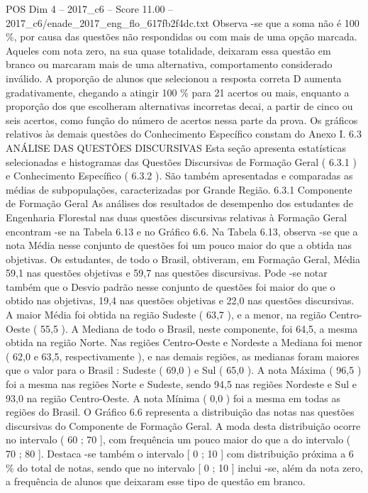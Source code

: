 \begin{textsample}{POS Dim 4 – 2017\_c6 – Score 11.00 – 2017\_c6/enade\_2017\_eng\_flo\_617fb2f4dc.txt}
Observa -se que a soma não é 100 \%, por causa das questões não respondidas ou com mais de uma opção marcada.
Aqueles com nota zero, na sua quase totalidade, deixaram essa questão em branco ou marcaram mais de uma alternativa, comportamento considerado inválido.
A proporção de alunos que selecionou a resposta correta D aumenta gradativamente, chegando a atingir 100 \% para 21 acertos ou mais, enquanto a proporção dos que escolheram alternativas incorretas decai, a partir de cinco ou seis acertos, como função do número de acertos nessa parte da prova.
Os gráficos relativos às demais questões do Conhecimento Específico constam do Anexo I. 6.3 ANÁLISE DAS QUESTÕES DISCURSIVAS Esta seção apresenta estatísticas selecionadas e histogramas das Questões Discursivas de Formação Geral ( 6.3.1 ) e Conhecimento Específico ( 6.3.2 ).
São também apresentadas e comparadas as médias de subpopulações, caracterizadas por Grande Região. 6.3.1 Componente de Formação Geral As análises dos resultados de desempenho dos estudantes de Engenharia Florestal nas duas questões discursivas relativas à Formação Geral encontram -se na Tabela 6.13 e no Gráfico 6.6.
Na Tabela 6.13, observa -se que a nota Média nesse conjunto de questões foi um pouco maior do que a obtida nas objetivas.
Os estudantes, de todo o Brasil, obtiveram, em Formação Geral, Média 59,1 nas questões objetivas e 59,7 nas questões discursivas.
Pode -se notar também que o Desvio padrão nesse conjunto de questões foi maior do que o obtido nas objetivas, 19,4 nas questões objetivas e 22,0 nas questões discursivas.
A maior Média foi obtida na região Sudeste ( 63,7 ), e a menor, na região Centro-Oeste ( 55,5 ).
A Mediana de todo o Brasil, neste componente, foi 64,5, a mesma obtida na região Norte.
Nas regiões Centro-Oeste e Nordeste a Mediana foi menor ( 62,0 e 63,5, respectivamente ), e nas demais regiões, as medianas foram maiores que o valor para o Brasil : Sudeste ( 69,0 ) e Sul ( 65,0 ).
A nota Máxima ( 96,5 ) foi a mesma nas regiões Norte e Sudeste, sendo 94,5 nas regiões Nordeste e Sul e 93,0 na região Centro-Oeste.
A nota Mínima ( 0,0 ) foi a mesma em todas as regiões do Brasil.
O Gráfico 6.6 representa a distribuição das notas nas questões discursivas do Componente de Formação Geral.
A moda desta distribuição ocorre no intervalo ( 60 ; 70 ], com frequência um pouco maior do que a do intervalo ( 70 ; 80 ].
Destaca -se também o intervalo [ 0 ; 10 ] com distribuição próxima a 6 \% do total de notas, sendo que no intervalo [ 0 ; 10 ] inclui -se, além da nota zero, a frequência de alunos que deixaram esse tipo de questão em branco.

\end{textsample}
